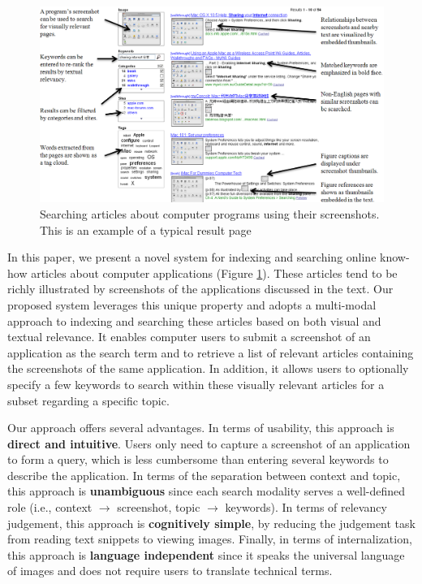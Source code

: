 \documentclass{www2010-submission}
\begin{document}

\begin{figure}
\includegraphics[width=2\columnwidth]{figure/main_result.png}
\caption{Searching articles about computer programs using
their screenshots. This is an example of a typical
result page}
\label{fig:main_result}
\end{figure}

In this paper, we present a novel system for indexing and searching
online know-how articles about computer applications (Figure
\ref{fig:main_result}).  These articles tend to be richly illustrated
by screenshots of the applications discussed in the text. Our proposed
system leverages this unique property and adopts a multi-modal
approach to indexing and searching these articles based on both visual
and textual relevance.  It enables computer users to submit a
screenshot of an application as the search term and to retrieve a list
of relevant articles containing the screenshots of the same
application. In addition, it allows users to optionally specify a few
keywords to search within these visually relevant articles for a
subset regarding a specific topic.

Our approach offers several advantages. In terms of usability, this
approach is \textbf{direct and intuitive}. Users only need to capture a
screenshot of an application to form a query, which is less cumbersome
than entering several keywords to describe the application. In terms
of the separation between context and topic, this approach is
\textbf{unambiguous} since each search modality serves a well-defined
role (i.e., context $\rightarrow$ screenshot, topic
$\rightarrow$ keywords). In terms of relevancy judgement, this approach 
is \textbf{cognitively simple}, by reducing the judgement task from
reading text snippets to viewing images.  Finally, in terms of
internalization, this approach is \textbf{language independent} since
it speaks the universal language of images and does not require
users to translate technical terms.
\end{document}
